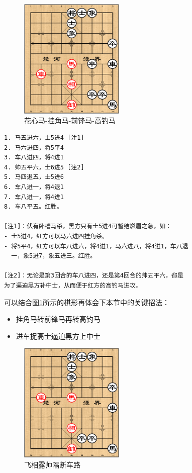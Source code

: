 \documentclass[a5paper,twoside]{book}
\begin{document}
\begin{figure}[H]
\centering
\includegraphics[width=5cm]{pic/花心马-挂角马-前锋马-高钓马.png}
\caption{花心马-挂角马-前锋马-高钓马}
\end{figure}

\begin{verbatim}
1. 马五进六，士5进4 [注1]
2. 马六进四，将5平4
3. 车八进四，将4进1
4. 帅五平六，士6进5 [注2]
5. 马四退五，士5进6
6. 车八进一，将4退1
7. 车八进一，将4进1
8. 车八平五。红胜。
   
[注1]：伏有卧槽马杀，黑方只有士5进4可暂结燃眉之急，如：
- 士5进4，红方可以马六进四挂角杀。
- 将5平4，红方可以车八进六，将4进1，马六进八，将4进1，车八退
  一，象5进7，象五进三。红胜。
  
[注2]：无论是第3回合的车八进四，还是第4回合的帅五平六，都是
为了逼迫黑方补中士，从而便于红方的高钓马进攻。
\end{verbatim}

可以结合图\ref{fxlsgdcl}所示的棋形再体会下本节中的关键招法：
\begin{itemize}
\item 挂角马转前锋马再转高钓马
\item 进车捉高士逼迫黑方上中士
\end{itemize}

\begin{figure}[H]
\centering
\includegraphics[width=5cm]{pic/飞相露帅隔断车路.png}
\caption{\label{fxlsgdcl}飞相露帅隔断车路}
\end{figure}
\end{document}

